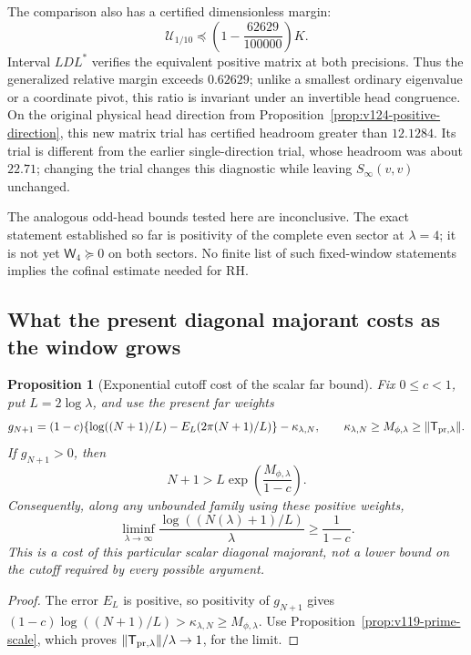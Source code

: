 \documentclass[11pt]{article}
\newtheorem{proposition}[theorem]{Proposition}
\theoremstyle{remark}
\begin{document}
The comparison also has a certified dimensionless margin:
\begin{equation}\label{eq:v125-relative-margin}
 \mathcal U_{1/10}\preceq
 \left(1-\frac{62629}{100000}\right)K.
\end{equation}
Interval $LDL^*$ verifies the equivalent positive matrix at both
precisions.  Thus the generalized relative margin exceeds $0.62629$;
unlike a smallest ordinary eigenvalue or a coordinate pivot, this
ratio is invariant under an invertible head congruence.  On the
original physical head direction from
Proposition~\ref{prop:v124-positive-direction}, this new matrix trial
has certified headroom greater than $12.1284$.  Its trial is different
from the earlier single-direction trial, whose headroom was about
$22.71$; changing the trial changes this diagnostic while leaving
$S_\infty(v,v)$ unchanged.

The analogous odd-head bounds tested here are inconclusive.  The
exact statement established so far is positivity of the complete
even sector at $\lambda=4$; it is not yet
$\mathsf W_4\succeq0$ on both sectors.  No finite list of such
fixed-window statements implies the cofinal estimate needed for RH.

\subsection*{What the present diagonal majorant costs as the window grows}

\begin{proposition}[Exponential cutoff cost of the scalar far bound]
\label{prop:v125-cutoff-cost}
Fix $0\le c<1$, put $L=2\log\lambda$, and use the present far
weights
\[
 g_{N+1}=(1-c)\{\log((N+1)/L)-E_L(2\pi(N+1)/L)\}
               -\kappa_{\lambda,N},
 \qquad \kappa_{\lambda,N}\ge M_{\phi,\lambda}
                    \ge\|\mathsf T_{{\rm pr},\lambda}\|.
\]
If $g_{N+1}>0$, then
\begin{equation}\label{eq:v125-cutoff-cost}
 N+1>L\exp\!\left(\frac{M_{\phi,\lambda}}{1-c}\right).
\end{equation}
Consequently, along any unbounded family using these positive weights,
\[
 \liminf_{\lambda\to\infty}
 \frac{\log((N(\lambda)+1)/L)}{\lambda}\ge\frac1{1-c}.
\]
This is a cost of this particular scalar diagonal majorant, not a
lower bound on the cutoff required by every possible argument.
\end{proposition}
\begin{proof}
The error $E_L$ is positive, so positivity of $g_{N+1}$ gives
$(1-c)\log((N+1)/L)>\kappa_{\lambda,N}\ge M_{\phi,\lambda}$.
Use Proposition~\ref{prop:v119-prime-scale}, which proves
$\|\mathsf T_{{\rm pr},\lambda}\|/\lambda\to1$, for the limit.
\end{proof}
\end{document}
